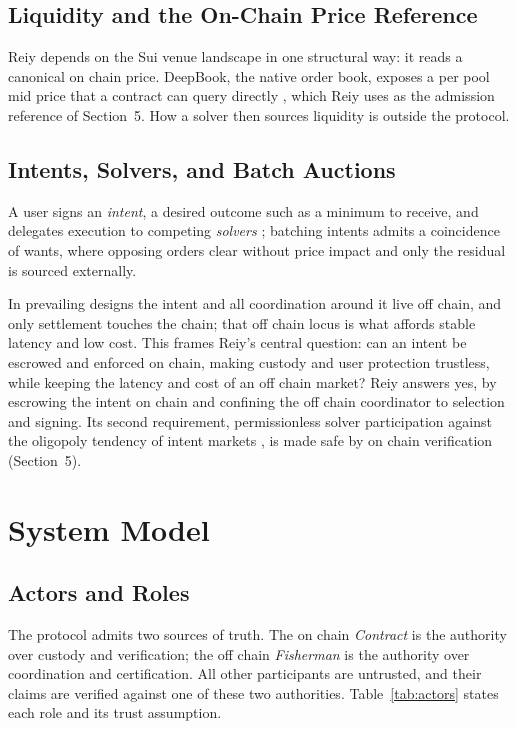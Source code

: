 \documentclass[10pt,sigconf,nonacm]{acmart}
\theoremstyle{reiythm}
\begin{document}
\subsection{Liquidity and the On-Chain Price Reference}

Reiy depends on the Sui venue landscape in one structural way: it reads a canonical
on chain price. DeepBook, the native order book, exposes a per pool mid price that a
contract can query directly \cite{querypoolsui}, which Reiy uses as the admission
reference of Section~5. How a solver then sources liquidity is outside the protocol.

\subsection{Intents, Solvers, and Batch Auctions}

A user signs an \emph{intent}, a desired outcome such as a minimum to receive, and
delegates execution to competing \emph{solvers} \cite{documentationcowdaoe}; batching
intents admits a coincidence of wants, where opposing orders clear without price
impact and only the residual is sourced externally.

In prevailing designs the intent and all coordination around it live off chain, and
only settlement touches the chain; that off chain locus is what affords stable latency
and low cost. This frames Reiy's central question: can an intent be escrowed and
enforced on chain, making custody and user protection trustless, while keeping the
latency and cost of an off chain market? Reiy answers yes, by escrowing the intent on
chain and confining the off chain coordinator to selection and signing. Its second
requirement, permissionless solver participation against the oligopoly tendency of
intent markets \cite{chitra2024analysisintentbasedmarkets}, is made safe by on chain
verification (Section~5).

\section{System Model}

\subsection{Actors and Roles}

The protocol admits two sources of truth. The on chain \emph{Contract} is the
authority over custody and verification; the off chain \emph{Fisherman} is the
authority over coordination and certification. All other participants are
untrusted, and their claims are verified against one of these two authorities.
Table~\ref{tab:actors} states each role and its trust assumption.
\end{document}

